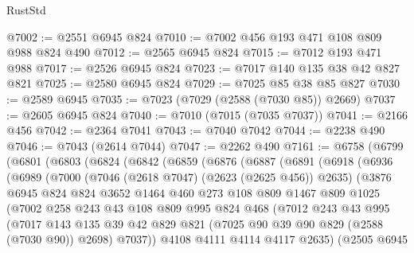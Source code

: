 \begin{lexlean}{RustStd}
\begin{coremodule}
@7002 := @2551 @6945 @824
@7010 := @7002 @456 @193 @471 @108 @809 @988 @824 @490
@7012 := @2565 @6945 @824
@7015 := @7012 @193 @471 @988
@7017 := @2526 @6945 @824
@7023 := @7017 @140 @135 @38 @42 @827 @821
@7025 := @2580 @6945 @824
@7029 := @7025 @85 @38 @85 @827
@7030 := @2589 @6945
@7035 := @7023 (@7029 (@2588 (@7030 @85)) @2669)
@7037 := @2605 @6945 @824
@7040 := @7010 (@7015 (@7035 @7037))
@7041 := @2166 @456
@7042 := @2364 @7041
@7043 := @7040 @7042
@7044 := @2238 @490
@7046 := @7043 (@2614 @7044)
@7047 := @2262 @490
@7161 := @6758
    (@6799
      (@6801
        (@6803
          (@6824
            (@6842
              (@6859
                (@6876
                  (@6887
                    (@6891
                      (@6918
                        (@6936
                          (@6989
                            (@7000
                              (@7046 (@2618 @7047) (@2623 (@2625 @456)) @2635)
                              (@3876
                                @6945
                                @824
                                @824
                                @3652
                                @1464
                                @460
                                @273
                                @108
                                @809
                                @1467
                                @809
                                @1025
                                (@7002
                                  @258
                                  @243
                                  @43
                                  @108
                                  @809
                                  @995
                                  @824
                                  @468
                                  (@7012
                                    @243
                                    @43
                                    @995
                                    (@7017
                                      @143
                                      @135
                                      @39
                                      @42
                                      @829
                                      @821
                                      (@7025 @90 @39 @90 @829 (@2588 (@7030 @90)) @2698)
                                      @7037))
                                  @4108
                                  @4111
                                  @4114
                                  @4117
                                  @2635)
                                (@2505
                                  @6945

\end{coremodule}
\end{lexlean}
